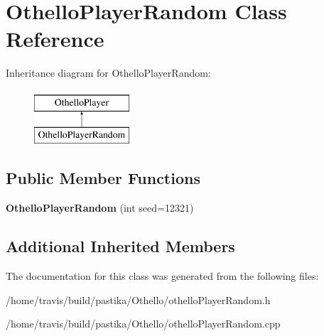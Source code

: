 \hypertarget{classOthelloPlayerRandom}{\section{Othello\-Player\-Random Class Reference}
\label{classOthelloPlayerRandom}
}
Inheritance diagram for Othello\-Player\-Random\-:\begin{figure}[H]
\begin{center}
\leavevmode
\includegraphics[height=2.000000cm]{classOthelloPlayerRandom}
\end{center}
\end{figure}
\subsection*{Public Member Functions}
\begin{DoxyCompactItemize}
\item 
\hypertarget{classOthelloPlayerRandom_ab997f756b9de745208e3e540c36caf25}{{\bfseries Othello\-Player\-Random} (int seed=12321)}\label{classOthelloPlayerRandom_ab997f756b9de745208e3e540c36caf25}

\end{DoxyCompactItemize}
\subsection*{Additional Inherited Members}


The documentation for this class was generated from the following files\-:\begin{DoxyCompactItemize}
\item 
/home/travis/build/pastika/\-Othello/othello\-Player\-Random.\-h\item 
/home/travis/build/pastika/\-Othello/othello\-Player\-Random.\-cpp\end{DoxyCompactItemize}
